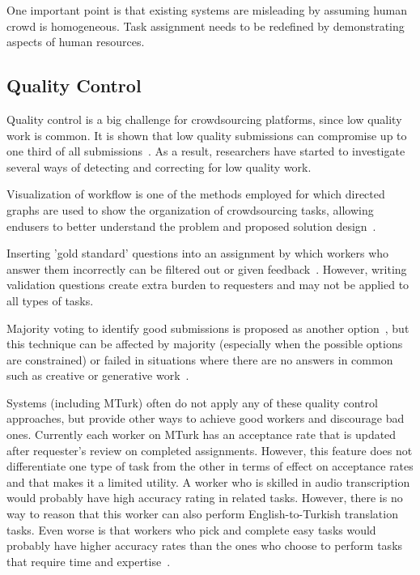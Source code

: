One important point is that existing systems are misleading by assuming 
human crowd is homogeneous. Task assignment needs to be redefined 
by demonstrating aspects of human resources.

\subsection{Quality Control}
Quality control is a big challenge for crowdsourcing platforms, since low quality work 
is common. It is shown that low quality submissions can compromise up to one third 
of all submissions~\cite{Bernstein2010}. As a result, researchers have started to 
investigate several ways of detecting and correcting for low quality work.

Visualization of workflow is one of the methods employed for which directed graphs 
are used to show the organization of crowdsourcing tasks, allowing endusers 
to better understand the problem and proposed solution design~\cite{Kulkarni2012, Kittur2012}.

Inserting 'gold standard' questions into an assignment by which workers 
who answer them incorrectly can be filtered out or given feedback~\cite{Burch2009}. 
However, writing validation questions create extra burden to requesters and 
may not be applied to all types of tasks.

Majority voting to identify good submissions is proposed as another 
option~\cite{Burch2009, Bernstein2010}, but this technique can be affected 
by majority (especially when the possible options are constrained) or failed in 
situations where there are no answers in common such as creative or generative 
work~\cite{Rzeszotarski2012}.

Systems (including MTurk) often do not apply any of these quality control approaches, 
but provide other ways to achieve good workers and discourage bad ones. 
Currently each worker on MTurk has an acceptance rate that is updated after 
requester's review on completed assignments. However, this feature does not 
differentiate one type of task from the other in terms of effect on acceptance rates 
and that makes it a limited utility. A worker who is skilled in audio transcription would 
probably have high accuracy rating in related tasks. However, there is no way to 
reason that this worker can also perform English-to-Turkish translation tasks. 
Even worse is that workers who pick and complete easy tasks would probably 
have higher accuracy rates than the ones who choose to perform tasks that 
require time and expertise~\cite{Barowy2012}.

